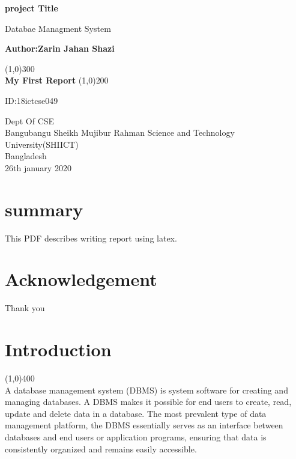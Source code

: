 \documentclass{article}
\begin{document}
\begin{titlepage}
    \begin{center}
        \vspace*{1cm}
 
        \Huge
        \textbf{project Title}
 
        \vspace{0.5cm}
        \LARGE
        Databae Managment System
 
        \vspace{1.5cm}
 
        \textbf{Author:Zarin Jahan Shazi}
        
        \vfill
       
        \line(1,0){300}\\
        \huge{\bfseries My First Report}
 		\line(1,0){200}
 
        \vspace{0.8cm}
 
        {ID:18ictcse049}
 
        \Large
        Dept Of CSE\\
        Bangubangu Sheikh Mujibur Rahman Science and Technology University(SHIICT)\\
        Bangladesh\\
        26th january 2020
 
    \end{center}
\end{titlepage}
\newpage
\section*{summary}
This PDF describes writing report using latex.
\cleardoublepage
\section*{Acknowledgement}
Thank you
\cleardoublepage
\tableofcontents
\thispagestyle{empty}
\cleardoublepage
\setcounter{page}{1}

\section{Introduction}
\line(1,0){400}\\
 A database management system (DBMS) is system software for creating and managing databases. A DBMS makes it possible for end users to create, read, update and delete data in a database. The most prevalent type of data management platform, the DBMS essentially serves as an interface between databases and end users or application programs, ensuring that data is consistently organized and remains easily accessible.
 \newpage
\end{document}
